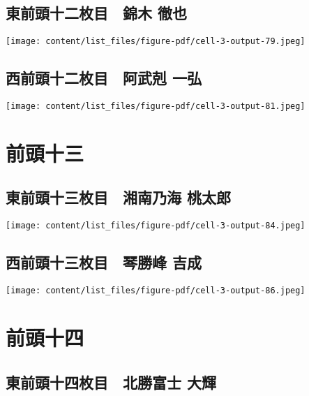 \documentclass[
  letterpaper,
]{bxjsbook}
\begin{document}
\subsection{東前頭十二枚目　錦木
徹也}\label{ux6771ux524dux982dux5341ux4e8cux679aux76ee-ux9326ux6728-ux5fb9ux4e5f}

\texttt{[image: content/list\_files/figure-pdf/cell-3-output-79.jpeg]}

\subsection{西前頭十二枚目　阿武剋
一弘}\label{ux897fux524dux982dux5341ux4e8cux679aux76ee-ux963fux6b66ux524b-ux4e00ux5f18}

\texttt{[image: content/list\_files/figure-pdf/cell-3-output-81.jpeg]}

\section{前頭十三}\label{ux524dux982dux5341ux4e09}

\subsection{東前頭十三枚目　湘南乃海
桃太郎}\label{ux6771ux524dux982dux5341ux4e09ux679aux76ee-ux6e58ux5357ux4e43ux6d77-ux6843ux592aux90ce}

\texttt{[image: content/list\_files/figure-pdf/cell-3-output-84.jpeg]}

\subsection{西前頭十三枚目　琴勝峰
吉成}\label{ux897fux524dux982dux5341ux4e09ux679aux76ee-ux7434ux52ddux5cf0-ux5409ux6210}

\texttt{[image: content/list\_files/figure-pdf/cell-3-output-86.jpeg]}

\section{前頭十四}\label{ux524dux982dux5341ux56db}

\subsection{東前頭十四枚目　北勝富士
大輝}\label{ux6771ux524dux982dux5341ux56dbux679aux76ee-ux5317ux52ddux5bccux58eb-ux5927ux8f1d}
\end{document}
